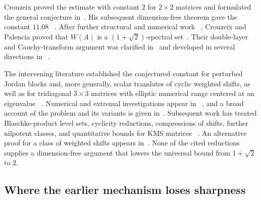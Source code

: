\documentclass[preprints,article,submit,oneauthor]{Definitions/mdpi}
\theoremstyle{mdpi}
\theoremstyle{definition}
\begin{document}
Crouzeix proved the estimate with constant $2$ for $2\times2$ matrices and
formulated the general conjecture in~\cite{Crouzeix2004}.  His
subsequent dimension-free theorem gave the constant $11.08$~%
\cite{Crouzeix2007}.  After further structural and numerical work~%
\cite{Crouzeix2016}, Crouzeix and Palencia proved that $W(A)$ is a
$(1+\sqrt2)$-spectral set~\cite{CrouzeixPalencia2017}.  Their
double-layer and Cauchy-transform argument was clarified in~%
\cite{RansfordSchwenninger2018} and developed in several directions in~%
\cite{CaldwellGreenbaumLi2018,CrouzeixGreenbaum2019}.

The intervening literature established the conjectured constant for
perturbed Jordan blocks and, more generally, scalar translates of
cyclic weighted shifts, as well as for tridiagonal $3\times3$ matrices
with elliptic numerical range centered at an eigenvalue~%
\cite{ChoiGreenbaum2012,Choi2013,GladerKurulaLindstrom2018}.
Numerical and extremal investigations appear in~%
\cite{GreenbaumOverton2018,Li2020}, and a broad account of the problem
and its variants is given in~\cite{BickelEtAl2020}.  Subsequent work
has treated Blaschke-product level sets, cyclicity reductions,
compressions of shifts, further nilpotent classes, and quantitative
bounds for KMS matrices~%
\cite{BickelGorkin2024,OLoughlinVirtanen2024,BickelEtAl2024,
CrouzeixGreenbaumLi2024}.  An alternative proof for a class of weighted shifts
appears in~\cite{CrouzeixGreenbaum2025}.  None of the cited reductions
supplies a dimension-free argument that lowers the universal bound from
$1+\sqrt2$ to $2$.

\subsection{Where the earlier mechanism loses sharpness}
\end{document}

